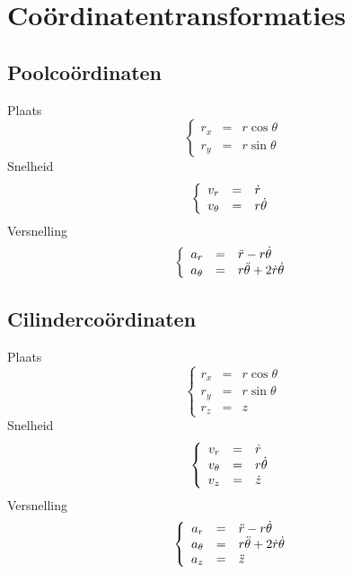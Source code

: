 \newpage
\twocolumn
\section{Coördinatentransformaties}
\label{sec:Coordinatentransformaties}

\subsection{Poolcoördinaten}
\label{sec:PoolCoords}
Plaats
\[
  \left\{
    \begin{array}{rcl}
      r_x & = & r \cos \theta\\
      r_y & = & r \sin \theta
    \end{array}
  \right.
\]
Snelheid
\[
  \left\{
    \begin{array}{rcl}
      v_{r}      & = & \dot{r}\\
      v_{\theta} & = & r \dot{\theta}
    \end{array}
  \right.
\]
Versnelling
\[
  \left\{
    \begin{array}{rcl}
      a_{r}      & = & \ddot{r} - r\dot{\theta}\\
      a_{\theta} & = & r\ddot{\theta} + 2\dot{r}\dot{\theta}
    \end{array}
  \right.
\]

\subsection{Cilindercoördinaten}
\label{sec:CilinderCoords}
Plaats
\[
  \left\{
    \begin{array}{rcl}
      r_x & = & r \cos \theta\\
      r_y & = & r \sin \theta\\
      r_z & = & z
    \end{array}
  \right.
\]
Snelheid
\[
  \left\{
    \begin{array}{rcl}
      v_{r}      & = & \dot{r}\\
      v_{\theta} & = & r \dot{\theta}\\
      v_z        & = & \dot{z}
    \end{array}
  \right.
\]
Versnelling
\[
  \left\{
    \begin{array}{rcl}
      a_{r}      & = & \ddot{r} - r\dot{\theta}\\
      a_{\theta} & = & r\ddot{\theta} + 2\dot{r}\dot{\theta}\\
      a_{z}      & = & \ddot{z}
    \end{array}
  \right.
\]

